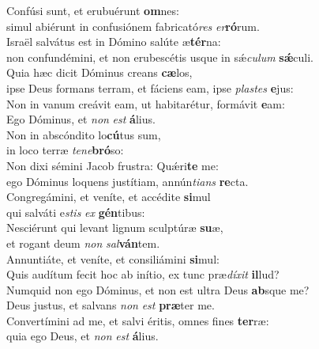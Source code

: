 \evenverse Confúsi sunt, et erubuérunt \textbf{om}nes:~\*\\
\evenverse simul abiérunt in confusiónem fabricató\textit{res} \textit{er}\textbf{ró}rum.\\
\oddverse Israël salvátus est in Dómino salúte æ\textbf{tér}na:~\*\\
\oddverse non confundémini, et non erubescétis usque in sǽ\textit{cu}\textit{lum} \textbf{sǽ}culi.\\
\evenverse Quia hæc dicit Dóminus creans \textbf{cæ}los,~\*\\
\evenverse ipse Deus formans terram, et fáciens eam, ipse \textit{pla}\textit{stes} \textbf{e}jus:\\
\oddverse Non in vanum creávit eam, ut habitarétur, formávit \textbf{e}am:~\*\\
\oddverse Ego Dóminus, et \textit{non} \textit{est} \textbf{á}lius.\\
\evenverse Non in abscóndito lo\textbf{cú}tus sum,~\*\\
\evenverse in loco terræ \textit{te}\textit{ne}\textbf{bró}so:\\
\oddverse Non dixi sémini Jacob frustra: Quǽri\textbf{te} me:~\*\\
\oddverse ego Dóminus loquens justítiam, annún\textit{ti}\textit{ans} \textbf{re}cta.\\
\evenverse Congregámini, et veníte, et accédite \textbf{si}mul~\*\\
\evenverse qui salváti e\textit{stis} \textit{ex} \textbf{gén}tibus:\\
\oddverse Nesciérunt qui levant lignum sculptúræ \textbf{su}æ,~\*\\
\oddverse et rogant deum \textit{non} \textit{sal}\textbf{ván}tem.\\
\evenverse Annuntiáte, et veníte, et consiliámini \textbf{si}mul:~\*\\
\evenverse Quis audítum fecit hoc ab inítio, ex tunc præ\textit{dí}\textit{xit} \textbf{il}lud?\\
\oddverse Numquid non ego Dóminus, et non est ultra Deus \textbf{ab}sque me?~\*\\
\oddverse Deus justus, et salvans \textit{non} \textit{est} \textbf{præ}ter me.\\
\evenverse Convertímini ad me, et salvi éritis, omnes fines \textbf{ter}ræ:~\*\\
\evenverse quia ego Deus, et \textit{non} \textit{est} \textbf{á}lius.\\
